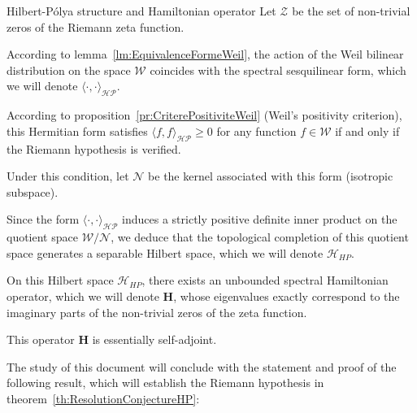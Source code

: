 \documentclass[Riemann_Hypothesis.tex]{subfiles}
\begin{document}
\begin{lemmaEn}[label=lm:ConstructionMetriqueHP_intro]{Hilbert-Pólya structure and Hamiltonian operator}
    Let $\mathcal{Z}$ be the set of non-trivial zeros of the Riemann zeta function.\par
    According to {lemma}~\ref{lm:EquivalenceFormeWeil},
    the action of the Weil bilinear distribution on the space $\mathcal{W}$
    coincides with the spectral sesquilinear form, which we will
    denote $\langle \cdot, \cdot \rangle_{\mathcal{HP}}$. \par
    According to {proposition}~\ref{pr:CriterePositiviteWeil} (Weil's positivity
    criterion), this Hermitian form satisfies $\langle f, f \rangle_{\mathcal{HP}}
    \geq 0$ for any function $f \in \mathcal{W}$ if and only if the Riemann
    hypothesis is verified. \par
    Under this condition, let $\mathcal{N}$ be the kernel associated with this form
    (isotropic subspace). \par
    Since the form $\langle \cdot, \cdot \rangle_{\mathcal{HP}}$ induces a strictly
    positive definite inner product on the quotient space
    $\mathcal{W} / \mathcal{N}$, we deduce that the topological completion of this
    quotient space generates a separable Hilbert space, which we will denote
    $\mathcal{H}_{HP}$. \par
    On this Hilbert space $\mathcal{H}_{HP}$, there exists an unbounded
    spectral Hamiltonian operator, which we will denote $\mathbf{H}$, whose
    eigenvalues exactly correspond to the imaginary parts of the non-trivial
    zeros of the zeta function. \par
    This operator $\mathbf{H}$ is essentially self-adjoint.
\end{lemmaEn}

The study of this document will conclude with the statement and proof of the following result, 
which will establish the Riemann hypothesis in {theorem}~\ref{th:ResolutionConjectureHP}:
\end{document}
